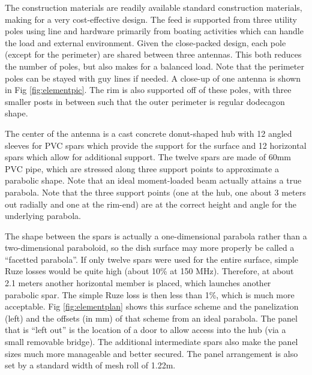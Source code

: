 \documentclass[preprint,11pt]{aastex}
\begin{document}
The construction materials are readily available standard construction materials, making for a very cost-effective design.  The feed is supported from three utility poles using line and hardware primarily from boating activities which can handle the load and external environment.  Given the close-packed design, each pole (except for the perimeter) are shared between three antennas.  This both reduces the number of poles, but also makes for a balanced load.  Note that the perimeter poles can be stayed with guy lines if needed.  A close-up of one antenna is shown in Fig \ref{fig:elementpic}.  The rim is also supported off of these poles, with three smaller posts in between such that the outer perimeter is regular dodecagon shape.  

The center of the antenna is a cast concrete donut-shaped hub with 12 angled sleeves for PVC spars which provide the support for the surface and 12 horizontal spars which allow for additional support.  The twelve spars are made of 60mm PVC pipe, which are stressed along three support points to approximate a parabolic shape.  Note that an ideal moment-loaded beam actually attains a true parabola.  Note that the three support points (one at the hub, one about 3 meters out radially and one at the rim-end) are at the correct height and angle for the underlying parabola.  

The shape between the spars is actually a one-dimensional parabola rather than a two-dimensional paraboloid, so the dish surface may more properly be called a ``facetted parabola''.  If only twelve spars were used for the entire surface, simple Ruze losses would be quite high (about 10\% at 150 MHz).  Therefore, at about 2.1 meters another horizontal member is placed, which launches another parabolic spar.  The simple Ruze loss is then less than 1\%, which is much more acceptable.  Fig \ref{fig:elementplan} shows this surface scheme and the panelization (left) and the offsets (in mm) of that scheme from an ideal parabola.  The panel that is ``left out'' is the location of a door to allow access into the hub (via a small removable bridge).  The additional intermediate spars also make the panel sizes much more manageable and better secured.  The panel arrangement is also set by a standard width of mesh roll of 1.22m.
\end{document}
